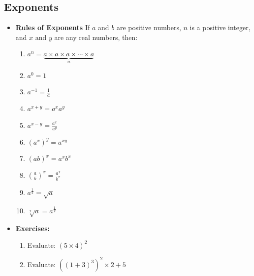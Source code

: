 \documentclass[11pt]{article}
\theoremstyle{definition}
\theoremstyle{remark}
\begin{document}
\subsection{Exponents}
\begin{itemize} 
\item \textbf {Rules of Exponents} If $a$ and $b$ are positive numbers, $n$ is a positive integer, and $x$ and $y$ are any real numbers, then:
\begin{enumerate}
\item $a^n = \underbrace{a \times a \times a \times \cdots \times a}_n$
\item $a^0 = 1$
\item $a^{-1} = \displaystyle \frac{1}{a}$
\item $a^{x+y}=a^x a^y$
\item $a^{x-y}= \displaystyle \frac{a^x}{a^y}$
\item $(a^x)^y = a^{xy}$
\item $(ab)^x = a^x b^x$
\item $\displaystyle \left( \frac{a}{b} \right)^x = \frac{a^x}{b^x}$
\item $a^{\frac{1}{2}} = \sqrt{a}$
\item $\sqrt[x]{a} = a^{\frac{1}{x}}$
\end{enumerate}
\item \textbf{Exercises:}
\begin{enumerate}
\item Evaluate: $(5 \times 4)^2$
\item Evaluate: $((1+3)^3)^2 \times 2 + 5$
\end{enumerate}
\end{itemize}
\end{document}
